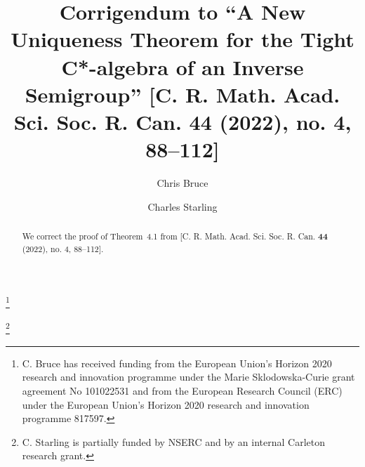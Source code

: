 \documentclass[12pt]{amsart}
\theoremstyle{definition}
\theoremstyle{remark}
\numberwithin{equation}{section}
\begin{document}
\title[Corrigendum]{Corrigendum to ``A New Uniqueness Theorem for the Tight C*-algebra of an Inverse Semigroup'' [C. R. Math. Acad. Sci. Soc. R. Can. 44 (2022), no. 4, 88--112] }

\author{Chris Bruce} 
\address[C. Bruce]{School of Mathematics and Statistics, University of Glasgow, University Place, Glasgow G12 8QQ, United Kingdom}

\thanks{C. Bruce has received funding from the European Union’s Horizon 2020 research and innovation programme under the Marie Sklodowska-Curie grant agreement No 101022531 and from the European Research Council (ERC) under the European Union’s Horizon 2020 research and innovation programme 817597.}


\author{Charles Starling}
\address[C. Starling]{Carleton University, School of Mathematics and Statistics. 4302 Herzberg Laboratories}

\thanks{C. Starling is partially funded by NSERC and by an internal Carleton research grant.}

\begin{abstract}
We correct the proof of Theorem~4.1 from [C. R. Math. Acad. Sci. Soc. R. Can. \textbf{44} (2022), no. 4, 88--112]. 
\end{abstract}

\maketitle
\end{document}
